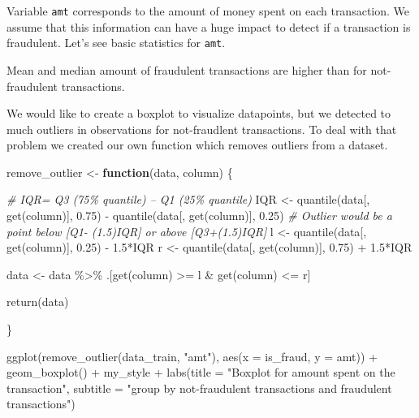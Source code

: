 \documentclass[
]{report}
\newenvironment{Shaded}{\begin{snugshade}}{\end{snugshade}}
\newcommand{\AttributeTok}[1]{\textcolor[rgb]{0.77,0.63,0.00}{#1}}
\newcommand{\CommentTok}[1]{\textcolor[rgb]{0.56,0.35,0.01}{\textit{#1}}}
\newcommand{\ControlFlowTok}[1]{\textcolor[rgb]{0.13,0.29,0.53}{\textbf{#1}}}
\newcommand{\FloatTok}[1]{\textcolor[rgb]{0.00,0.00,0.81}{#1}}
\newcommand{\FunctionTok}[1]{\textcolor[rgb]{0.00,0.00,0.00}{#1}}
\newcommand{\NormalTok}[1]{#1}
\newcommand{\OtherTok}[1]{\textcolor[rgb]{0.56,0.35,0.01}{#1}}
\newcommand{\SpecialCharTok}[1]{\textcolor[rgb]{0.00,0.00,0.00}{#1}}
\newcommand{\StringTok}[1]{\textcolor[rgb]{0.31,0.60,0.02}{#1}}
\begin{document}
Variable \texttt{amt} corresponds to the amount of money spent on each
transaction. We assume that this information can have a huge impact to
detect if a transaction is fraudulent. Let's see basic statistics for
\texttt{amt}.

Mean and median amount of fraudulent transactions are higher than for
not-fraudulent transactions.

We would like to create a boxplot to visualize datapoints, but we
detected to much outliers in observations for not-fraudlent
transactions. To deal with that problem we created our own function
which removes outliers from a dataset.

\begin{Shaded}
\begin{Highlighting}[]
\NormalTok{remove\_outlier }\OtherTok{\textless{}{-}} \ControlFlowTok{function}\NormalTok{(data, column) \{}
  
  \CommentTok{\# IQR= Q3 (75\% quantile) – Q1 (25\% quantile)}
\NormalTok{  IQR }\OtherTok{\textless{}{-}} \FunctionTok{quantile}\NormalTok{(data[, }\FunctionTok{get}\NormalTok{(column)], }\FloatTok{0.75}\NormalTok{) }\SpecialCharTok{{-}} \FunctionTok{quantile}\NormalTok{(data[, }\FunctionTok{get}\NormalTok{(column)], }\FloatTok{0.25}\NormalTok{) }
  \CommentTok{\# Outlier would be a point below [Q1{-} (1.5)IQR] or above [Q3+(1.5)IQR]}
\NormalTok{  l }\OtherTok{\textless{}{-}} \FunctionTok{quantile}\NormalTok{(data[, }\FunctionTok{get}\NormalTok{(column)], }\FloatTok{0.25}\NormalTok{) }\SpecialCharTok{{-}} \FloatTok{1.5}\SpecialCharTok{*}\NormalTok{IQR}
\NormalTok{  r }\OtherTok{\textless{}{-}} \FunctionTok{quantile}\NormalTok{(data[, }\FunctionTok{get}\NormalTok{(column)], }\FloatTok{0.75}\NormalTok{) }\SpecialCharTok{+} \FloatTok{1.5}\SpecialCharTok{*}\NormalTok{IQR}
  
\NormalTok{  data }\OtherTok{\textless{}{-}}\NormalTok{ data }\SpecialCharTok{\%\textgreater{}\%}
\NormalTok{    .[}\FunctionTok{get}\NormalTok{(column) }\SpecialCharTok{\textgreater{}=}\NormalTok{ l }\SpecialCharTok{\&} \FunctionTok{get}\NormalTok{(column) }\SpecialCharTok{\textless{}=}\NormalTok{ r]}
  
  \FunctionTok{return}\NormalTok{(data)}
  
\NormalTok{\}}
\end{Highlighting}
\end{Shaded}

\begin{Shaded}
\begin{Highlighting}[]
\FunctionTok{ggplot}\NormalTok{(}\FunctionTok{remove\_outlier}\NormalTok{(data\_train, }\StringTok{"amt"}\NormalTok{), }
       \FunctionTok{aes}\NormalTok{(}\AttributeTok{x =}\NormalTok{ is\_fraud, }\AttributeTok{y =}\NormalTok{ amt)) }\SpecialCharTok{+}
  \FunctionTok{geom\_boxplot}\NormalTok{() }\SpecialCharTok{+}
\NormalTok{  my\_style }\SpecialCharTok{+}
  \FunctionTok{labs}\NormalTok{(}\AttributeTok{title =} \StringTok{"Boxplot for amount spent on the transaction"}\NormalTok{,}
       \AttributeTok{subtitle =} \StringTok{"group by not{-}fraudulent transactions and fraudulent transactions"}\NormalTok{)}
\end{Highlighting}
\end{Shaded}
\end{document}
